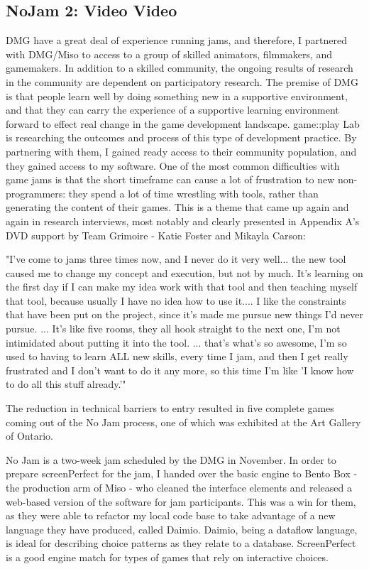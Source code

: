 \subsection{NoJam 2: Video Video}
DMG have a great deal of experience running jams, and therefore, I partnered with DMG/Miso to access to a group of skilled animators, filmmakers, and gamemakers. In addition to a skilled community, the ongoing results of research in the community are dependent on participatory research. The premise of DMG is that people learn well by doing something new in a supportive environment, and that they can carry the experience of a supportive learning environment forward to effect real change in the game development landscape. game::play Lab is researching the outcomes and process of this type of development practice. By partnering with them, I gained ready access to their community population, and they gained access to my software. One of the most common difficulties with game jams is that the short timeframe can cause a lot of frustration to new non-programmers: they spend a lot of time wrestling with tools, rather than generating the content of their games. This is a theme that came up again and again in research interviews, most notably and clearly presented in Appendix A's DVD support by Team Grimoire - Katie Foster and Mikayla Carson:

"I've come to jams three times now, and I never do it very well... the new tool caused me to change my concept and execution, but not by much. It's learning on the first day if I can make my idea work with that tool and then teaching myself that tool, because usually I have no idea how to use it.... I like the constraints that have been put on the project, since it's made me pursue new things I'd never pursue. ... It's like five rooms, they all hook straight to the next one, I'm not intimidated about putting it into the tool. ... that's what's so awesome, I'm so used to having to learn ALL new skills, every time I jam, and then I get really frustrated and I don't want to do it any more, so this time I'm like 'I know how to do all this stuff already.'" 

The reduction in technical barriers to entry resulted in five complete games coming out of the No Jam process, one of which was exhibited at the Art Gallery of Ontario.

No Jam is a two-week jam scheduled by the DMG in November. In order to prepare screenPerfect for the jam, I handed over the basic engine to Bento Box - the production arm of Miso - who cleaned the interface elements and released a web-based version of the software for jam participants. This was a win for them, as they were able to refactor my local code base to take advantage of a new language they have produced, called Daimio. Daimio, being a dataflow language, is ideal for describing choice patterns as they relate to a database. ScreenPerfect is a good engine match for types of games that rely on interactive choices.

